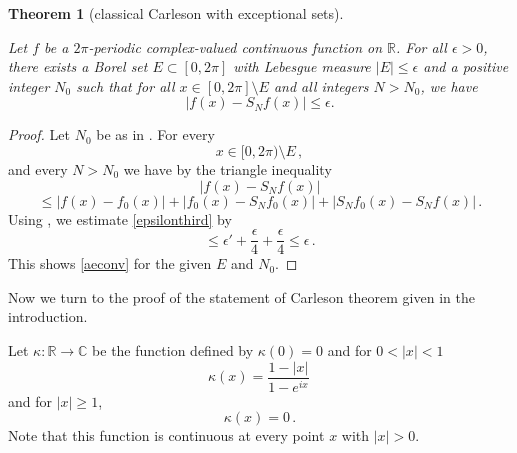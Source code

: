 \documentclass[10pt,a4paper]{article}
\theoremstyle{plain}
\newtheorem{theorem}{Theorem}[subsection]
\theoremstyle{definition}
\numberwithin{equation}{subsection}
\newcommand{\R}{{\mathbb{R}}}
\newcommand{\lean}[1]{}
\newcommand{\uses}[1]{}
\newcommand{\leanok}{}
\def\C{\mathbb{C}}
\begin{document}
\begin{theorem}[classical Carleson with exceptional sets]
    \label{exceptional-set-carleson}
    \leanok
    \lean{exceptional_set_carleson}
    \uses{smooth-approximation, convergence-for-smooth,
    control-approximation-effect}
    Let $f$ be a $2\pi$-periodic complex-valued continuous function on $\mathbb{R}$. For all $\epsilon>0$, there exists a Borel set $E\subset [0,2\pi]$ with Lebesgue measure $|E|\le \epsilon$ and a positive integer $N_0$ such that for all $x\in [0,2\pi]\setminus E$ and all integers $N>N_0$, we have
    \begin{equation}\label{aeconv}
    |f(x)-S_N f(x)|\le \epsilon.
    \end{equation}
\end{theorem}
\begin{proof}
\leanok
Let $N_0$ be as in .
For every
\begin{equation}
x\in [0, 2\pi) \setminus E\, ,
\end{equation}
and every $N>N_0$ we have by the triangle inequality
\begin{equation*}
    |f(x)-S_Nf(x)|
    \end{equation*}
    \begin{equation}\label{epsilonthird}
    \le |f(x)-f_0(x)|+ |f_0(x)-S_Nf_0(x)|+|S_Nf_0(x)-S_N f(x)|\, .
\end{equation}
Using , we estimate \eqref{epsilonthird} by
\begin{equation}
    \le \epsilon' +\frac \epsilon 4 +\frac \epsilon 4\le \epsilon\, .
\end{equation}
This shows \eqref{aeconv} for the given $E$ and $N_0$.
\end{proof}

Now we turn to the proof of the statement of Carleson theorem given in the introduction.


Let $\kappa:\R\to \C$ be the function defined by
$\kappa(0)=0$ and for $0<|x|<1$
\begin{equation}\label{eq-hilker}
\kappa(x)=\frac { 1-|x|}{1-e^{ix}}\,
\end{equation}
and for $|x|\ge 1$,
\begin{equation}\label{eq-hilker1}
\kappa(x)=0\, .
\end{equation}
Note that this function is continuous at every point $x$ with $|x|>0$.
\end{document}
